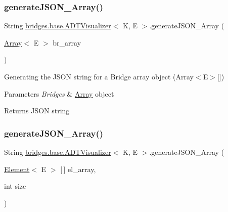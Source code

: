 \subsubsection{\texorpdfstring{generate\+J\+S\+O\+N\+\_\+\+Array()}{generateJSON\_Array()}\hspace{0.1cm}{\footnotesize\ttfamily [1/2]}}
{\footnotesize\ttfamily String \hyperlink{classbridges_1_1base_1_1_a_d_t_visualizer}{bridges.\+base.\+A\+D\+T\+Visualizer}$<$ K, E $>$.generate\+J\+S\+O\+N\+\_\+\+Array (\begin{DoxyParamCaption}\item[{\hyperlink{classbridges_1_1base_1_1_array}{Array}$<$ E $>$}]{br\+\_\+array }\end{DoxyParamCaption})}

Generating the J\+S\+ON string for a Bridge array object (Array$<$\+E$>$\mbox{[}\mbox{]})


\begin{DoxyParams}{Parameters}
{\em Bridges} & \hyperlink{classbridges_1_1base_1_1_array}{Array} object\\
\hline
\end{DoxyParams}
\begin{DoxyReturn}{Returns}
J\+S\+ON string 
\end{DoxyReturn}
\hypertarget{classbridges_1_1base_1_1_a_d_t_visualizer_a309d4f0521b66bb1329c0362f1ca5d33}{}\label{classbridges_1_1base_1_1_a_d_t_visualizer_a309d4f0521b66bb1329c0362f1ca5d33} 
\subsubsection{\texorpdfstring{generate\+J\+S\+O\+N\+\_\+\+Array()}{generateJSON\_Array()}\hspace{0.1cm}{\footnotesize\ttfamily [2/2]}}
{\footnotesize\ttfamily String \hyperlink{classbridges_1_1base_1_1_a_d_t_visualizer}{bridges.\+base.\+A\+D\+T\+Visualizer}$<$ K, E $>$.generate\+J\+S\+O\+N\+\_\+\+Array (\begin{DoxyParamCaption}\item[{\hyperlink{classbridges_1_1base_1_1_element}{Element}$<$ E $>$ \mbox{[}$\,$\mbox{]}}]{el\+\_\+array,  }\item[{int}]{size }\end{DoxyParamCaption})}

